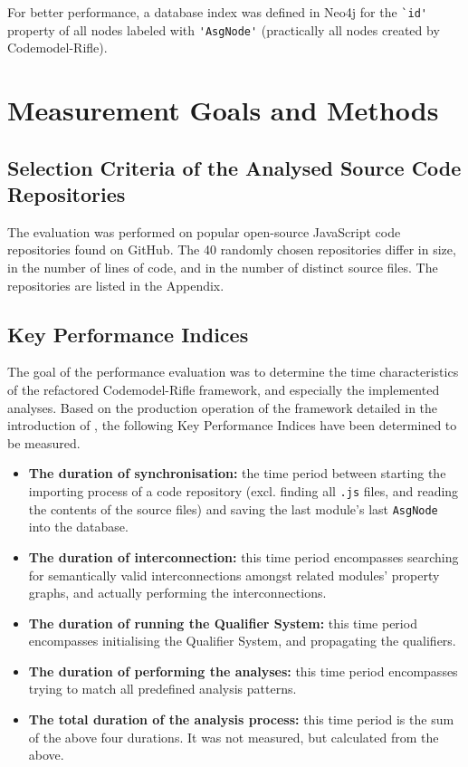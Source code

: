 For better performance, a database index was defined in Neo4j for the \lstinline{`id'} property of all nodes labeled with \lstinline{'AsgNode'} (practically all nodes created by Codemodel-Rifle).


\section{Measurement Goals and Methods}

\subsection{Selection Criteria of the Analysed Source Code Repositories}

The evaluation was performed on popular open-source JavaScript code repositories found on GitHub. The 40 randomly chosen repositories differ in size, in the number of lines of code, and in the number of distinct source files. The repositories are listed in the Appendix.


\subsection{Key Performance Indices}

The goal of the performance evaluation was to determine the time characteristics of the refactored Codemodel-Rifle framework, and especially the implemented analyses. Based on the production operation of the framework detailed in the introduction of , the following Key Performance Indices have been determined to be measured.

\begin{itemize}
\item \textbf{The duration of synchronisation:} the time period between starting the importing process of a code repository (excl. finding all \lstinline{.js} files, and reading the contents of the source files) and saving the last module's last \lstinline{AsgNode} into the database.
\item \textbf{The duration of interconnection:} this time period encompasses searching for semantically valid interconnections amongst related modules' property graphs, and actually performing the interconnections.
\item \textbf{The duration of running the Qualifier System:} this time period encompasses initialising the Qualifier System, and propagating the qualifiers.
\item \textbf{The duration of performing the analyses:} this time period encompasses trying to match all predefined analysis patterns.
\item \textbf{The total duration of the analysis process:} this time period is the sum of the above four durations. It was not measured, but calculated from the above.
\end{itemize}


